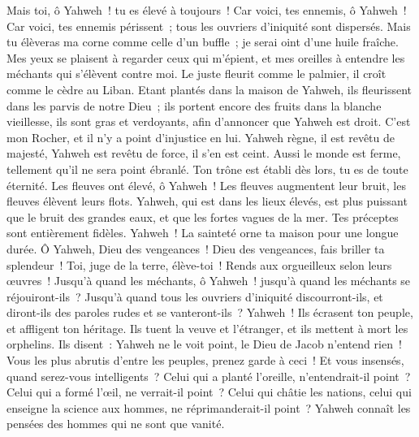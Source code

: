\begin{multicols}{2}
Mais toi, ô Yahweh~! tu es élevé à toujours~!
Car voici, tes ennemis, ô Yahweh~! Car voici, tes ennemis périssent~; tous les ouvriers d'iniquité sont dispersés.
Mais tu élèveras ma corne comme celle d'un buffle~; je serai oint d'une huile fraîche.
Mes yeux se plaisent à regarder ceux qui m'épient, et mes oreilles à entendre les méchants qui s'élèvent contre moi.
Le juste fleurit comme le palmier, il croît comme le cèdre au Liban.
Etant plantés dans la maison de Yahweh, ils fleurissent dans les parvis de notre Dieu~;
ils portent encore des fruits dans la blanche vieillesse, ils sont gras et verdoyants,
afin d'annoncer que Yahweh est droit. C'est mon Rocher, et il n'y a point d'injustice en lui.
\VerseOne{}Yahweh règne, il est revêtu de majesté, Yahweh est revêtu de force, il s'en est ceint. Aussi le monde est ferme, tellement qu'il ne sera point ébranlé.
Ton trône est établi dès lors, tu es de toute éternité.
Les fleuves ont élevé, ô Yahweh~! Les fleuves augmentent leur bruit, les fleuves élèvent leurs flots.
Yahweh, qui est dans les lieux élevés, est plus puissant que le bruit des grandes eaux, et que les fortes vagues de la mer.
Tes préceptes sont entièrement fidèles. Yahweh~! La sainteté orne ta maison pour une longue durée.
\VerseOne{}Ô Yahweh, Dieu des vengeances~! Dieu des vengeances, fais briller ta splendeur~!
Toi, juge de la terre, élève-toi~! Rends aux orgueilleux selon leurs œuvres~!
Jusqu'à quand les méchants, ô Yahweh~! jusqu'à quand les méchants se réjouiront-ils~?
Jusqu'à quand tous les ouvriers d'iniquité discourront-ils, et diront-ils des paroles rudes et se vanteront-ils~?
Yahweh~! Ils écrasent ton peuple, et affligent ton héritage.
Ils tuent la veuve et l'étranger, et ils mettent à mort les orphelins.
Ils disent~: Yahweh ne le voit point, le Dieu de Jacob n'entend rien~!
Vous les plus abrutis d'entre les peuples, prenez garde à ceci~! Et vous insensés, quand serez-vous intelligents~?
Celui qui a planté l'oreille, n'entendrait-il point~? Celui qui a formé l'œil, ne verrait-il point~?
Celui qui châtie les nations, celui qui enseigne la science aux hommes, ne réprimanderait-il point~?
Yahweh connaît les pensées des hommes qui ne sont que vanité.

\end{multicols}
